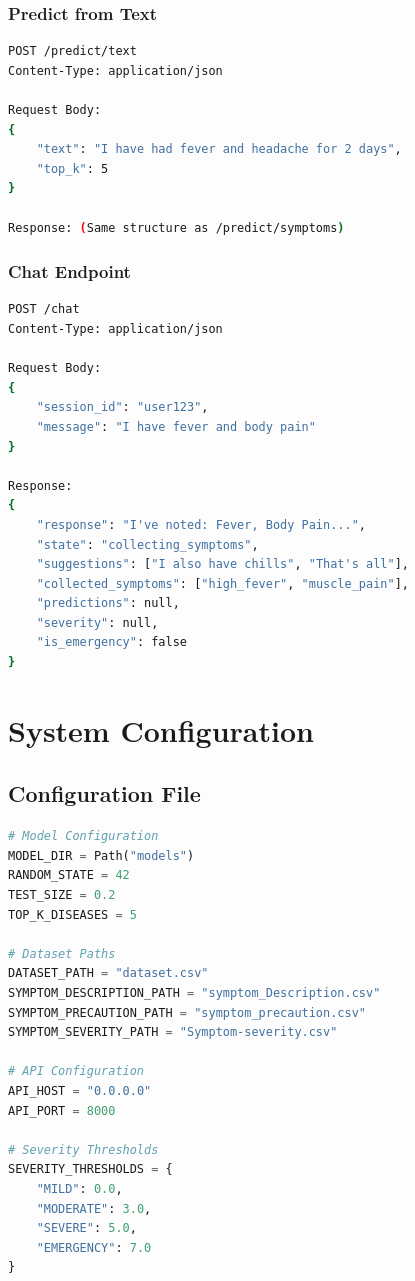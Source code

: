\subsubsection{Predict from Text}
\begin{lstlisting}[language=bash, caption=Predict from Natural Language Text]
POST /predict/text
Content-Type: application/json

Request Body:
{
    "text": "I have had fever and headache for 2 days",
    "top_k": 5
}

Response: (Same structure as /predict/symptoms)
\end{lstlisting}

\subsubsection{Chat Endpoint}
\begin{lstlisting}[language=bash, caption=Conversational Agent]
POST /chat
Content-Type: application/json

Request Body:
{
    "session_id": "user123",
    "message": "I have fever and body pain"
}

Response:
{
    "response": "I've noted: Fever, Body Pain...",
    "state": "collecting_symptoms",
    "suggestions": ["I also have chills", "That's all"],
    "collected_symptoms": ["high_fever", "muscle_pain"],
    "predictions": null,
    "severity": null,
    "is_emergency": false
}
\end{lstlisting}

\section{System Configuration}
\subsection{Configuration File}
\begin{lstlisting}[language=Python, caption=System Configuration]
# Model Configuration
MODEL_DIR = Path("models")
RANDOM_STATE = 42
TEST_SIZE = 0.2
TOP_K_DISEASES = 5

# Dataset Paths
DATASET_PATH = "dataset.csv"
SYMPTOM_DESCRIPTION_PATH = "symptom_Description.csv"
SYMPTOM_PRECAUTION_PATH = "symptom_precaution.csv"
SYMPTOM_SEVERITY_PATH = "Symptom-severity.csv"

# API Configuration
API_HOST = "0.0.0.0"
API_PORT = 8000

# Severity Thresholds
SEVERITY_THRESHOLDS = {
    "MILD": 0.0,
    "MODERATE": 3.0,
    "SEVERE": 5.0,
    "EMERGENCY": 7.0
}
\end{lstlisting}

